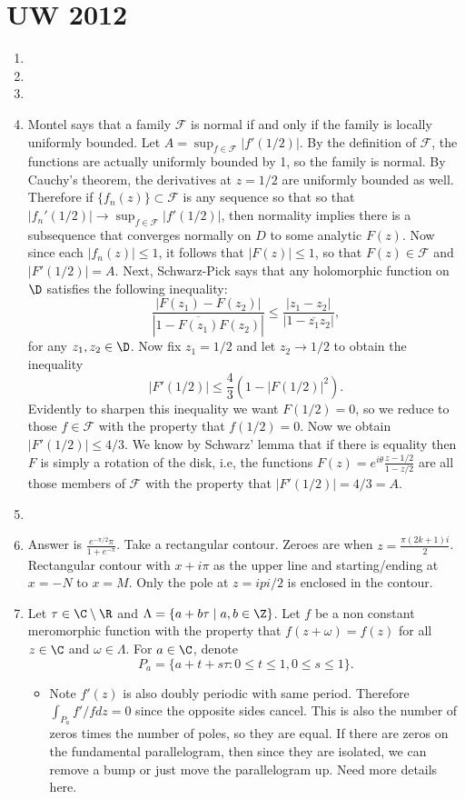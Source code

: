 \documentclass[11pt]{book}
\theoremstyle{definition}
\begin{document}
\section{UW 2012}
\begin{enumerate}
\item
\item
\item
\item Montel says that a family $\mathcal{F}$ is normal if and only if the family is locally uniformly bounded. Let $A=\sup_{f\in\mathcal{F}}|f'(1/2)|$. By the definition of $\mathcal{F}$, the functions are actually uniformly bounded by 1, so the family is normal. By Cauchy's theorem, the derivatives at $z=1/2$ are uniformly bounded as well. Therefore if $\{f_n(z)\}\subset\mathcal{F}$ is any sequence so that so that $|f_n'(1/2)|\to \sup_{f\in\mathcal{F}} |f'(1/2)|$, then normality implies there is a subsequence that converges normally on $D$ to some analytic $F(z)$. Now since each $|f_n(z)|\leq1$, it follows that $|F(z)|\leq1$, so that $F(z)\in \mathcal{F}$ and $|F'(1/2)|=A$. Next, Schwarz-Pick says that any holomorphic function on $\D$ satisfies the following inequality:
\[
\frac{|F(z_1)-F(z_2)|}{|1-\overline{F(z_1)}F(z_2)|}\leq\frac{|z_1-z_2|}{|1-\overline{z_1}z_2|},
\]
for any $z_1,z_2\in \D$. Now fix $z_1=1/2$ and let $z_2\to 1/2$ to obtain the inequality
\[
|F'(1/2)|\leq \frac{4}{3}(1-|F(1/2)|^2).
\]
Evidently to sharpen this inequality we want $F(1/2)=0$, so we reduce to those $f\in \mathcal{F}$ with the property that $f(1/2)=0$. Now we obtain $|F'(1/2)|\leq 4/3$. We know by Schwarz' lemma that if there is equality then $F$ is simply a rotation of the disk, i.e, the functions $F(z)=e^{i\theta}\frac{z-1/2}{1-z/2}$ are all those members of $\mathcal{F}$ with the property that $|F'(1/2)|=4/3=A$.
\item
\item Answer is $\frac{e^{-\pi/2}\pi}{1+e^{-\pi}}$. Take a rectangular contour. Zeroes are when $z=\frac{\pi(2k+1)i}{2}$. Rectangular contour with $x+i\pi$ as the upper line and starting/ending at $x=-N$ to $x=M$. Only the pole at $z=ipi/2$ is enclosed in the contour.
\item Let $\tau\in \C\setminus\R$ and $\Lambda=\{a+b\tau\mid a,b\in \Z\}$. Let $f$ be a non constant meromorphic function with the property that $f(z+\omega)=f(z)$ for all $z\in \C$ and $\omega\in\Lambda$. For $a\in\C$, denote \[
P_a=\{a+t+s\tau:0\leq t\leq 1,0\leq s\leq1\}.
\]
\begin{itemize}
\item Note $f'(z)$ is also doubly periodic with same period. Therefore $\int_{P_a}f'/f dz=0$ since the opposite sides cancel. This is also the number of zeros times the number of poles, so they are equal. If there are zeros on the fundamental parallelogram, then since they are isolated, we can remove a bump or just move the parallelogram up. Need more details here.

\end{itemize}
\end{enumerate}
\end{document}

